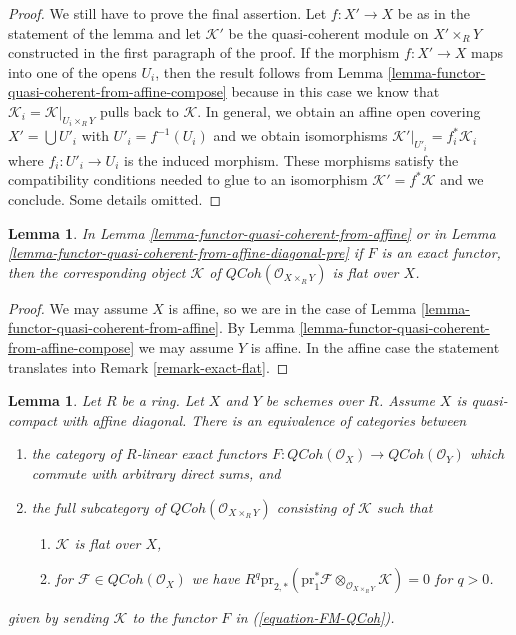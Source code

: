 \documentclass{stacks-project}
\theoremstyle{plain}
\newtheorem{lemma}[subsection]{Lemma}
\theoremstyle{definition}
\theoremstyle{remark}
\numberwithin{equation}{subsection}
\def\QCoh{\mathit{QCoh}}
\begin{document}
\begin{proof}
\medskip\noindent
We still have to prove the final assertion. Let $f : X' \to X$
be as in the statement of the lemma and let $\mathcal{K}'$
be the quasi-coherent module on $X' \times_R Y$ constructed
in the first paragraph of the proof. If the morphism
$f : X' \to X$ maps into one of the opens $U_i$, then the
result follows from
Lemma \ref{lemma-functor-quasi-coherent-from-affine-compose}
because in this case we know
that $\mathcal{K}_i = \mathcal{K}|_{U_i \times_R Y}$
pulls back to $\mathcal{K}$. In general, we obtain an
affine open covering $X' = \bigcup U'_i$ with $U'_i = f^{-1}(U_i)$
and we obtain isomorphisms
$\mathcal{K}'|_{U'_i} = f_i^*\mathcal{K}_i$ where
$f_i : U'_i \to U_i$ is the induced morphism.
These morphisms satisfy the compatibility conditions needed
to glue to an isomorphism $\mathcal{K}' = f^*\mathcal{K}$
and we conclude. Some details omitted.
\end{proof}

\begin{lemma}
\label{lemma-coh-noetherian-from-affine-flat}
In Lemma \ref{lemma-functor-quasi-coherent-from-affine}
or in Lemma \ref{lemma-functor-quasi-coherent-from-affine-diagonal-pre}
if $F$ is an exact functor, then the corresponding object
$\mathcal{K}$ of $\QCoh(\mathcal{O}_{X \times_R Y})$ is flat over $X$.
\end{lemma}

\begin{proof}
We may assume $X$ is affine, so we are in the case of
Lemma \ref{lemma-functor-quasi-coherent-from-affine}.
By Lemma \ref{lemma-functor-quasi-coherent-from-affine-compose}
we may assume $Y$ is affine. In the affine case the statement
translates into Remark \ref{remark-exact-flat}.
\end{proof}

\begin{lemma}
\label{lemma-functor-quasi-coherent-from-affine-diagonal}
Let $R$ be a ring. Let $X$ and $Y$ be schemes over $R$. Assume $X$ is
quasi-compact with affine diagonal.
There is an equivalence of categories between
\begin{enumerate}
\item the category of $R$-linear exact functors
$F : \QCoh(\mathcal{O}_X) \to \QCoh(\mathcal{O}_Y)$
which commute with arbitrary direct sums, and
\item the full subcategory of $\QCoh(\mathcal{O}_{X \times_R Y})$ consisting
of $\mathcal{K}$ such that
\begin{enumerate}
\item $\mathcal{K}$ is flat over $X$,
\item for $\mathcal{F} \in \QCoh(\mathcal{O}_X)$ we have
$R^q\text{pr}_{2, *}(\text{pr}_1^*\mathcal{F}
\otimes_{\mathcal{O}_{X \times_R Y}} \mathcal{K}) = 0$ for $q > 0$.
\end{enumerate}
\end{enumerate}
given by sending $\mathcal{K}$ to the functor $F$ in (\ref{equation-FM-QCoh}).
\end{lemma}
\end{document}
